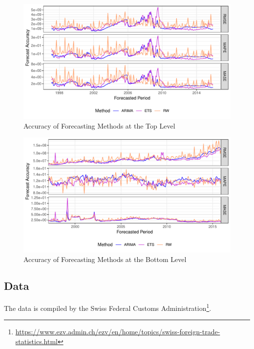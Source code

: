 \begin{figure}[H]
	\includegraphics[width=\textwidth]{fig/fig_eval_methods_top}
	\caption{Accuracy of Forecasting Methods at the Top Level}
\end{figure}

\begin{figure}[H]
	\includegraphics[width=\textwidth]{fig/fig_eval_methods_bottom}
	\caption{Accuracy of Forecasting Methods at the Bottom Level}
\end{figure}


\subsection{Data}
\label{sec:data}
The data is compiled by the Swiss Federal Customs Administration\footnote{\url{https://www.ezv.admin.ch/ezv/en/home/topics/swiss-foreign-trade-statistics.html}}.\\

